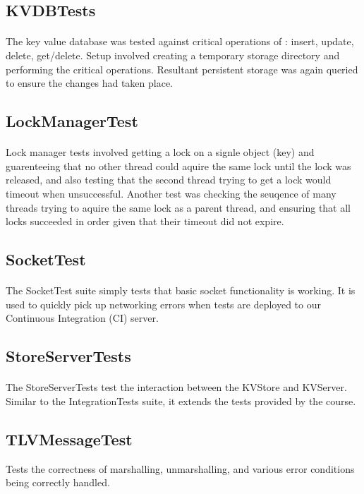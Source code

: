 \documentclass[10pt]{article}
\begin{document}
\begin{multicols}{2}
\subsection{KVDBTests}

\paragraph{} The key value database was tested against critical operations of : insert, update, delete, get/delete. Setup involved creating a temporary storage directory and performing the critical operations. Resultant persistent storage was again queried to ensure the changes had taken place.

\subsection{LockManagerTest}

\paragraph{} Lock manager tests involved getting a lock on a signle object (key) and guarenteeing that no other thread could aquire the same lock until the lock was released, and also testing that the second thread trying to get a lock would timeout when unsuccessful. Another test was checking the seuqence of many threads trying to aquire the same lock as a parent thread, and ensuring that all locks succeeded in order given that their timeout did not expire.

\subsection{SocketTest}

\paragraph{} The SocketTest suite simply tests that basic socket functionality is working. It is used to quickly pick up networking errors when tests are deployed to our Continuous Integration (CI) server.

\subsection{StoreServerTests}

\paragraph{} The StoreServerTests test the interaction between the KVStore and KVServer. Similar to the IntegrationTests suite, it extends the tests provided by the course.

\subsection{TLVMessageTest} Tests the correctness of marshalling, unmarshalling, and various error conditions being correctly handled.

\end{multicols}
\end{document}
